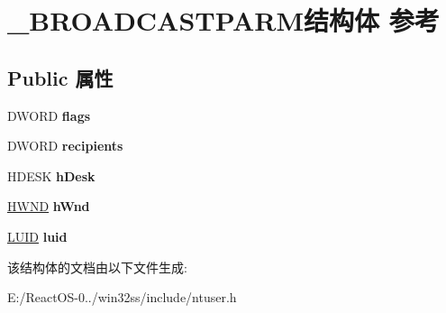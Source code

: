 \hypertarget{struct___b_r_o_a_d_c_a_s_t_p_a_r_m}{}\section{\+\_\+\+B\+R\+O\+A\+D\+C\+A\+S\+T\+P\+A\+R\+M结构体 参考}
\label{struct___b_r_o_a_d_c_a_s_t_p_a_r_m}
\subsection*{Public 属性}
\begin{DoxyCompactItemize}
\item 
\mbox{\label{struct___b_r_o_a_d_c_a_s_t_p_a_r_m_a21bfd2808b172cc61de35c04872e0909}} 
D\+W\+O\+RD {\bfseries flags}
\item 
\mbox{\label{struct___b_r_o_a_d_c_a_s_t_p_a_r_m_a15383b213c49e57c872efdcd3685df6e}} 
D\+W\+O\+RD {\bfseries recipients}
\item 
\mbox{\label{struct___b_r_o_a_d_c_a_s_t_p_a_r_m_af2fb7a1fecdfc6f16783dd396f44c649}} 
H\+D\+E\+SK {\bfseries h\+Desk}
\item 
\mbox{\label{struct___b_r_o_a_d_c_a_s_t_p_a_r_m_a0c834730fa2118be3f232e0f6ac5a723}} 
\hyperlink{interfacevoid}{H\+W\+ND} {\bfseries h\+Wnd}
\item 
\mbox{\label{struct___b_r_o_a_d_c_a_s_t_p_a_r_m_a0429360b07f78da3e5c35d082611948f}} 
\hyperlink{struct___l_u_i_d}{L\+U\+ID} {\bfseries luid}
\end{DoxyCompactItemize}


该结构体的文档由以下文件生成\+:\begin{DoxyCompactItemize}
\item 
E\+:/\+React\+O\+S-\/0../win32ss/include/ntuser.\+h\end{DoxyCompactItemize}
